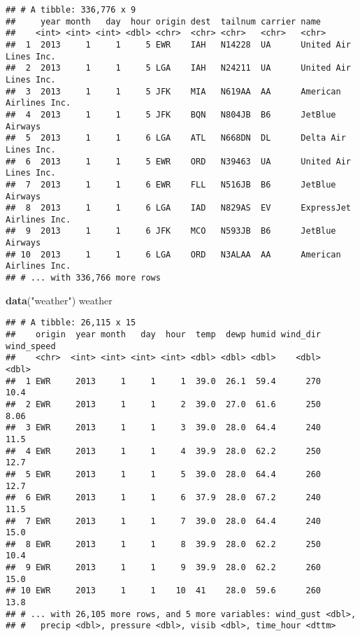\documentclass[
]{article}
\newenvironment{Shaded}{\begin{snugshade}}{\end{snugshade}}
\newcommand{\KeywordTok}[1]{\textcolor[rgb]{0.13,0.29,0.53}{\textbf{#1}}}
\newcommand{\NormalTok}[1]{#1}
\newcommand{\StringTok}[1]{\textcolor[rgb]{0.31,0.60,0.02}{#1}}
\begin{document}
\begin{verbatim}
## # A tibble: 336,776 x 9
##     year month   day  hour origin dest  tailnum carrier name                    
##    <int> <int> <int> <dbl> <chr>  <chr> <chr>   <chr>   <chr>                   
##  1  2013     1     1     5 EWR    IAH   N14228  UA      United Air Lines Inc.   
##  2  2013     1     1     5 LGA    IAH   N24211  UA      United Air Lines Inc.   
##  3  2013     1     1     5 JFK    MIA   N619AA  AA      American Airlines Inc.  
##  4  2013     1     1     5 JFK    BQN   N804JB  B6      JetBlue Airways         
##  5  2013     1     1     6 LGA    ATL   N668DN  DL      Delta Air Lines Inc.    
##  6  2013     1     1     5 EWR    ORD   N39463  UA      United Air Lines Inc.   
##  7  2013     1     1     6 EWR    FLL   N516JB  B6      JetBlue Airways         
##  8  2013     1     1     6 LGA    IAD   N829AS  EV      ExpressJet Airlines Inc.
##  9  2013     1     1     6 JFK    MCO   N593JB  B6      JetBlue Airways         
## 10  2013     1     1     6 LGA    ORD   N3ALAA  AA      American Airlines Inc.  
## # ... with 336,766 more rows
\end{verbatim}

\begin{Shaded}
\begin{Highlighting}[]
\KeywordTok{data}\NormalTok{(}\StringTok{"weather"}\NormalTok{)}
\NormalTok{weather}
\end{Highlighting}
\end{Shaded}

\begin{verbatim}
## # A tibble: 26,115 x 15
##    origin  year month   day  hour  temp  dewp humid wind_dir wind_speed
##    <chr>  <int> <int> <int> <int> <dbl> <dbl> <dbl>    <dbl>      <dbl>
##  1 EWR     2013     1     1     1  39.0  26.1  59.4      270      10.4 
##  2 EWR     2013     1     1     2  39.0  27.0  61.6      250       8.06
##  3 EWR     2013     1     1     3  39.0  28.0  64.4      240      11.5 
##  4 EWR     2013     1     1     4  39.9  28.0  62.2      250      12.7 
##  5 EWR     2013     1     1     5  39.0  28.0  64.4      260      12.7 
##  6 EWR     2013     1     1     6  37.9  28.0  67.2      240      11.5 
##  7 EWR     2013     1     1     7  39.0  28.0  64.4      240      15.0 
##  8 EWR     2013     1     1     8  39.9  28.0  62.2      250      10.4 
##  9 EWR     2013     1     1     9  39.9  28.0  62.2      260      15.0 
## 10 EWR     2013     1     1    10  41    28.0  59.6      260      13.8 
## # ... with 26,105 more rows, and 5 more variables: wind_gust <dbl>,
## #   precip <dbl>, pressure <dbl>, visib <dbl>, time_hour <dttm>
\end{verbatim}
\end{document}

